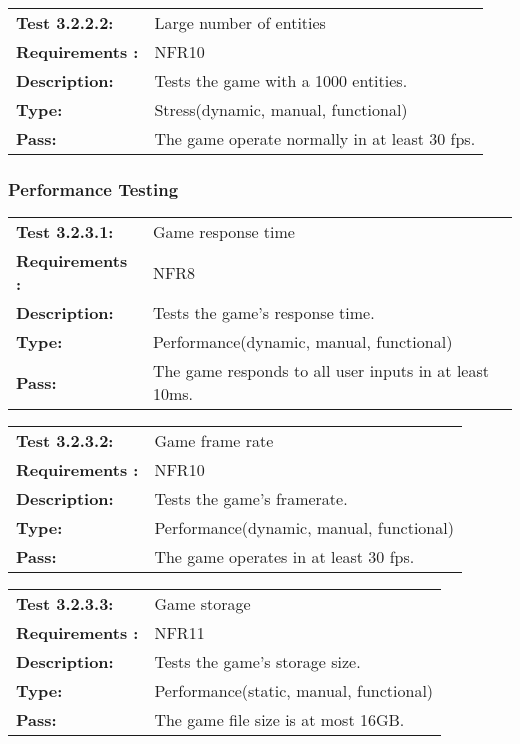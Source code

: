 \documentclass[12pt, titlepage]{article}
\begin{document}
\begin{tabular}{|l|p{10cm}|}
    \hline
    \bf{Test} 3.2.2.2: & Large number of entities \\
    \bf{Requirements} : & NFR10 \\
    \bf{Description}: & Tests the game with a 1000 entities. \\
    \bf{Type}: & Stress(dynamic, manual, functional) \\
    \bf{Pass}: & The game operate normally in at least 30 fps. \\
    \hline
\end{tabular}

\subsubsection{Performance Testing}

\begin{tabular}{|l|p{10cm}|}
    \hline
    \bf{Test} 3.2.3.1: & Game response time \\
    \bf{Requirements} : & NFR8 \\
    \bf{Description}: & Tests the game's response time. \\
    \bf{Type}: & Performance(dynamic, manual, functional) \\
    \bf{Pass}: & The game responds to all user inputs in at least 10ms. \\
    \hline
\end{tabular}

\begin{tabular}{|l|p{10cm}|}
    \hline
    \bf{Test} 3.2.3.2: & Game frame rate \\
    \bf{Requirements} : & NFR10 \\
    \bf{Description}: & Tests the game's framerate. \\
    \bf{Type}: & Performance(dynamic, manual, functional) \\
    \bf{Pass}: & The game operates in at least 30 fps. \\
    \hline
\end{tabular}

\begin{tabular}{|l|p{10cm}|}
    \hline
    \bf{Test} 3.2.3.3: & Game storage \\
    \bf{Requirements} : & NFR11 \\
    \bf{Description}: & Tests the game's storage size. \\
    \bf{Type}: & Performance(static, manual, functional) \\
    \bf{Pass}: & The game file size is at most 16GB. \\
    \hline
\end{tabular}
\end{document}
